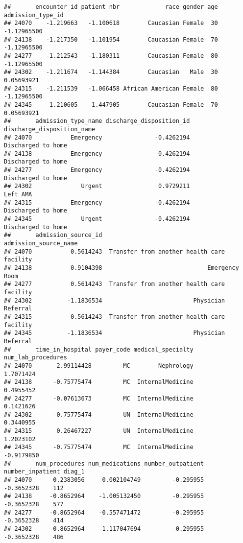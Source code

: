 \documentclass[
]{article}
\begin{document}
\begin{verbatim}
##       encounter_id patient_nbr             race gender age admission_type_id
## 24070    -1.219663   -1.100618        Caucasian Female  30       -1.12965500
## 24138    -1.217350   -1.101954        Caucasian Female  70       -1.12965500
## 24277    -1.212543   -1.180311        Caucasian Female  80       -1.12965500
## 24302    -1.211674   -1.144384        Caucasian   Male  30        0.05693921
## 24315    -1.211539   -1.066458 African American Female  80       -1.12965500
## 24345    -1.210605   -1.447905        Caucasian Female  70        0.05693921
##       admission_type_name discharge_disposition_id discharge_disposition_name
## 24070           Emergency               -0.4262194         Discharged to home
## 24138           Emergency               -0.4262194         Discharged to home
## 24277           Emergency               -0.4262194         Discharged to home
## 24302              Urgent                0.9729211                   Left AMA
## 24315           Emergency               -0.4262194         Discharged to home
## 24345              Urgent               -0.4262194         Discharged to home
##       admission_source_id                       admission_source_name
## 24070           0.5614243  Transfer from another health care facility
## 24138           0.9104398                              Emergency Room
## 24277           0.5614243  Transfer from another health care facility
## 24302          -1.1836534                          Physician Referral
## 24315           0.5614243  Transfer from another health care facility
## 24345          -1.1836534                          Physician Referral
##       time_in_hospital payer_code medical_specialty num_lab_procedures
## 24070       2.99114428         MC        Nephrology          1.7071424
## 24138      -0.75775474         MC  InternalMedicine          0.4955452
## 24277      -0.07613673         MC  InternalMedicine          0.1421626
## 24302      -0.75775474         UN  InternalMedicine          0.3440955
## 24315       0.26467227         UN  InternalMedicine          1.2023102
## 24345      -0.75775474         MC  InternalMedicine         -0.9179850
##       num_procedures num_medications number_outpatient number_inpatient diag_1
## 24070      0.2383056     0.002104749         -0.295955       -0.3652328    112
## 24138     -0.8652964    -1.005132450         -0.295955       -0.3652328    577
## 24277     -0.8652964    -0.557471472         -0.295955       -0.3652328    414
## 24302     -0.8652964    -1.117047694         -0.295955       -0.3652328    486

\end{verbatim}
\end{document}
